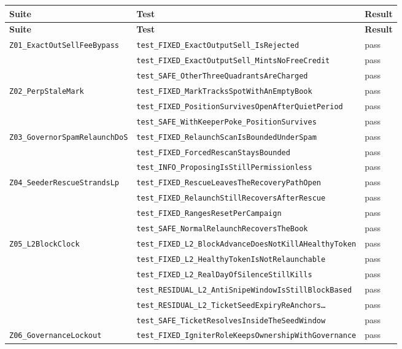 \documentclass[10pt,a4paper]{article}
\newcommand{\code}[1]{\texttt{\small #1}}
\begin{document}
\begin{center}\small
\begin{longtable}{@{}p{5.9cm}p{7.4cm}p{1.6cm}@{}}
\toprule \textbf{Suite} & \textbf{Test} & \textbf{Result} \\ \midrule \endfirsthead
\toprule \textbf{Suite} & \textbf{Test} & \textbf{Result} \\ \midrule \endhead
\bottomrule \endlastfoot
\code{Z01\_ExactOutSellFeeBypass} & \code{test\_FIXED\_ExactOutputSell\_IsRejected} & pass \\
 & \code{test\_FIXED\_ExactOutputSell\_MintsNoFreeCredit} & pass \\
 & \code{test\_SAFE\_OtherThreeQuadrantsAreCharged} & pass \\
\code{Z02\_PerpStaleMark} & \code{test\_FIXED\_MarkTracksSpotWithAnEmptyBook} & pass \\
 & \code{test\_FIXED\_PositionSurvivesOpenAfterQuietPeriod} & pass \\
 & \code{test\_SAFE\_WithKeeperPoke\_PositionSurvives} & pass \\
\code{Z03\_GovernorSpamRelaunchDoS} & \code{test\_FIXED\_RelaunchScanIsBoundedUnderSpam} & pass \\
 & \code{test\_FIXED\_ForcedRescanStaysBounded} & pass \\
 & \code{test\_INFO\_ProposingIsStillPermissionless} & pass \\
\code{Z04\_SeederRescueStrandsLp} & \code{test\_FIXED\_RescueLeavesTheRecoveryPathOpen} & pass \\
 & \code{test\_FIXED\_RelaunchStillRecoversAfterRescue} & pass \\
 & \code{test\_FIXED\_RangesResetPerCampaign} & pass \\
 & \code{test\_SAFE\_NormalRelaunchRecoversTheBook} & pass \\
\code{Z05\_L2BlockClock} & \code{test\_FIXED\_L2\_BlockAdvanceDoesNotKillAHealthyToken} & pass \\
 & \code{test\_FIXED\_L2\_HealthyTokenIsNotRelaunchable} & pass \\
 & \code{test\_FIXED\_L2\_RealDayOfSilenceStillKills} & pass \\
 & \code{test\_RESIDUAL\_L2\_AntiSnipeWindowIsStillBlockBased} & pass \\
 & \code{test\_RESIDUAL\_L2\_TicketSeedExpiryReAnchors\ldots} & pass \\
 & \code{test\_SAFE\_TicketResolvesInsideTheSeedWindow} & pass \\
\code{Z06\_GovernanceLockout} & \code{test\_FIXED\_IgniterRoleKeepsOwnershipWithGovernance} & pass \\

\end{longtable}
\end{center}
\end{document}

